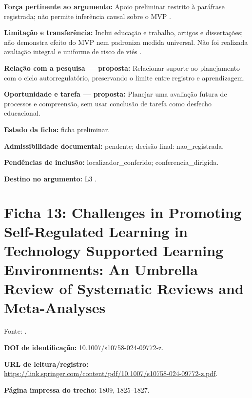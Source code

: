 \noindent\textbf{Força pertinente ao argumento:} Apoio preliminar restrito à paráfrase registrada; não permite inferência causal sobre o MVP \citep{education_patzak2025}.\par\medskip

\noindent\textbf{Limitação e transferência:} Inclui educação e trabalho, artigos e dissertações; não demonstra efeito do MVP nem padroniza medida universal. Não foi realizada avaliação integral e uniforme de risco de viés \citep{education_patzak2025}.\par\medskip

\noindent\textbf{Relação com a pesquisa — proposta:} Relacionar suporte ao planejamento com o ciclo autorregulatório, preservando o limite entre registro e aprendizagem.\par\medskip

\noindent\textbf{Oportunidade e tarefa — proposta:} Planejar uma avaliação futura de processos e compreensão, sem usar conclusão de tarefa como desfecho educacional.\par\medskip

\noindent\textbf{Estado da ficha:} ficha preliminar.\par\medskip

\noindent\textbf{Admissibilidade documental:} pendente; decisão final: nao\_registrada.\par\medskip

\noindent\textbf{Pendências de inclusão:} localizador\_conferido; conferencia\_dirigida.\par\medskip

\noindent\textbf{Destino no argumento:} L3 .

\clearpage\section*{Ficha 13: Challenges in Promoting Self-Regulated Learning in Technology Supported Learning Environments: An Umbrella Review of Systematic Reviews and Meta-Analyses}

Fonte: \citet[p. 1809, 1825–1827]{education_prasse2024}.

\noindent\textbf{DOI de identificação:} 10.1007/s10758-024-09772-z.\par\medskip

\noindent\textbf{URL de leitura/registro:} \url{https://link.springer.com/content/pdf/10.1007/s10758-024-09772-z.pdf}.\par\medskip

\noindent\textbf{Página impressa do trecho:} 1809, 1825–1827.\par\medskip

